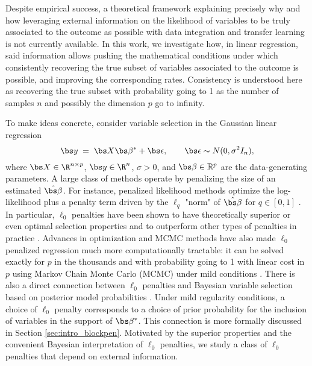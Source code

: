 \documentclass{article}
\begin{document}
Despite empirical success, a theoretical framework explaining precisely why and how leveraging external information on the likelihood of variables to be truly associated to the outcome as possible with data integration and transfer learning is not currently available. In this work, we investigate how, in linear regression, said information allows pushing the mathematical conditions under which consistently recovering the true subset of variables associated to the outcome is possible, and improving the corresponding rates. Consistency is understood here as recovering the true subset with probability going to 1 as the number of samples $n$ and possibly the dimension $p$ go to infinity. 

To make ideas concrete, consider variable selection in the Gaussian linear regression
\begin{equation}\label{eq:linearmodel}
	\bs y \;=\; \bs X \bs \beta^* + \bs\epsilon,\qquad \bs \epsilon \sim N(0,\sigma^2 I_n),
\end{equation}
where $\bs X\in \R^{n\times p}$, $\bs y\in \R^n$, $\sigma >0$, and $\bs \beta \in \mathbb{R}^p$ are the data-generating parameters. A large class of methods operate by penalizing the size of an estimated $\hat{\bs  \beta}$. For instance, penalized likelihood methods optimize the log-likelihood plus a penalty term driven by the $\ell_q$ "norm" of $\hat{\bs  \beta}$ for $q\in [0,1]$ \citep{lasso,bertsimas}. In particular, $\ell_0$ penalties have been shown to have theoretically superior or even optimal selection properties \cite{infotheowainwright, XXXbyon} and to outperform other types of penalties in practice \cite{mazumder2020}. Advances in optimization and MCMC methods have also made $\ell_0$ penalized regression much more computationally tractable: it can be solved exactly for $p$ in the thousands \citep{bertsimas2020sparse} and with probability going to 1 with linear cost in $p$ using Markov Chain Monte Carlo (MCMC) under mild conditions \citep{Yang2016,zhou2022}. There is also a direct connection between $\ell_0$ penalties and Bayesian variable selection based on posterior model probabilities \citep{BIC,EBIC,rossell2022concentration}. Under mild regularity conditions, a choice of $\ell_0$ penalty corresponds to a choice of prior probability for the inclusion of variables in the support of $\bs \beta^*$. This connection is more formally discussed in Section \ref{sec:intro_blockpen}. Motivated by the superior properties and the convenient Bayesian interpretation of $\ell_0$ penalties, we study a class of $\ell_0$ penalties that depend on external information.
\end{document}
